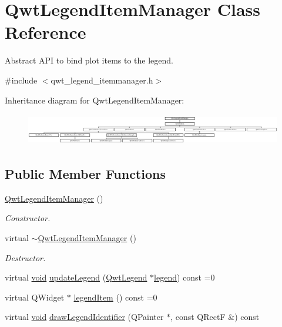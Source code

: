 \hypertarget{class_qwt_legend_item_manager}{\section{Qwt\-Legend\-Item\-Manager Class Reference}
\label{class_qwt_legend_item_manager}
}


Abstract A\-P\-I to bind plot items to the legend.  




{\ttfamily \#include $<$qwt\-\_\-legend\-\_\-itemmanager.\-h$>$}

Inheritance diagram for Qwt\-Legend\-Item\-Manager\-:\begin{figure}[H]
\begin{center}
\leavevmode
\includegraphics[height=1.400000cm]{class_qwt_legend_item_manager}
\end{center}
\end{figure}
\subsection*{Public Member Functions}
\begin{DoxyCompactItemize}
\item 
\hyperlink{class_qwt_legend_item_manager_a57827c099bdb5691820f749f3e5da710}{Qwt\-Legend\-Item\-Manager} ()
\begin{DoxyCompactList}\small\item\em Constructor. \end{DoxyCompactList}\item 
virtual \hyperlink{class_qwt_legend_item_manager_a8024d2ec1f7d289161311fa706e7cf61}{$\sim$\-Qwt\-Legend\-Item\-Manager} ()
\begin{DoxyCompactList}\small\item\em Destructor. \end{DoxyCompactList}\item 
virtual \hyperlink{group___u_a_v_objects_plugin_ga444cf2ff3f0ecbe028adce838d373f5c}{void} \hyperlink{class_qwt_legend_item_manager_ad3bd052ea242ef8595c7d6008b9cc6f4}{update\-Legend} (\hyperlink{class_qwt_legend}{Qwt\-Legend} $\ast$\hyperlink{_o_p_plots_8m_a2bd30f1401cbcf974221dcaaa67fd6fd}{legend}) const =0
\item 
virtual Q\-Widget $\ast$ \hyperlink{class_qwt_legend_item_manager_ac019b92797940db3cec2246a080598e0}{legend\-Item} () const =0
\item 
virtual \hyperlink{group___u_a_v_objects_plugin_ga444cf2ff3f0ecbe028adce838d373f5c}{void} \hyperlink{class_qwt_legend_item_manager_a8dd765a2fd5b9a286fa398810a5c2ad8}{draw\-Legend\-Identifier} (Q\-Painter $\ast$, const Q\-Rect\-F \&) const 
\end{DoxyCompactItemize}



